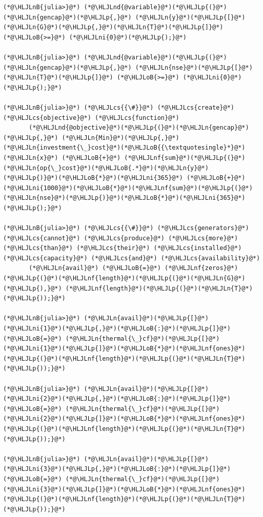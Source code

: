 \documentclass[12pt,a4paper]{article}
\newcommand{\HLJLn}[1]{#1}
\newcommand{\HLJLnd}[1]{\textcolor[RGB]{214,102,97}{#1}}
\newcommand{\HLJLnf}[1]{\textcolor[RGB]{66,102,213}{#1}}
\newcommand{\HLJLnB}[1]{\textcolor[RGB]{59,151,46}{#1}}
\newcommand{\HLJLni}[1]{\textcolor[RGB]{59,151,46}{#1}}
\newcommand{\HLJLoB}[1]{\textcolor[RGB]{102,102,102}{\textbf{#1}}}
\newcommand{\HLJLp}[1]{#1}
\newcommand{\HLJLcs}[1]{\textcolor[RGB]{153,153,119}{\textit{#1}}}
\begin{document}
\begin{lstlisting}
(*@\HLJLnB{julia>}@*) (*@\HLJLnd{@variable}@*)(*@\HLJLp{(}@*)(*@\HLJLn{gencap}@*)(*@\HLJLp{,}@*) (*@\HLJLn{y}@*)(*@\HLJLp{[}@*)(*@\HLJLn{G}@*)(*@\HLJLp{,}@*)(*@\HLJLn{T}@*)(*@\HLJLp{]}@*) (*@\HLJLoB{>=}@*) (*@\HLJLni{0}@*)(*@\HLJLp{);}@*)

(*@\HLJLnB{julia>}@*) (*@\HLJLnd{@variable}@*)(*@\HLJLp{(}@*)(*@\HLJLn{gencap}@*)(*@\HLJLp{,}@*) (*@\HLJLn{nse}@*)(*@\HLJLp{[}@*)(*@\HLJLn{T}@*)(*@\HLJLp{]}@*) (*@\HLJLoB{>=}@*) (*@\HLJLni{0}@*)(*@\HLJLp{);}@*)

(*@\HLJLnB{julia>}@*) (*@\HLJLcs{{\#}}@*) (*@\HLJLcs{create}@*) (*@\HLJLcs{objective}@*) (*@\HLJLcs{function}@*)
       (*@\HLJLnd{@objective}@*)(*@\HLJLp{(}@*)(*@\HLJLn{gencap}@*)(*@\HLJLp{,}@*) (*@\HLJLn{Min}@*)(*@\HLJLp{,}@*) (*@\HLJLn{investment{\_}cost}@*)(*@\HLJLoB{{\textquotesingle}*}@*)(*@\HLJLn{x}@*) (*@\HLJLoB{+}@*) (*@\HLJLnf{sum}@*)(*@\HLJLp{(}@*)(*@\HLJLn{op{\_}cost}@*)(*@\HLJLoB{.*}@*)(*@\HLJLn{y}@*)(*@\HLJLp{)}@*)(*@\HLJLoB{*}@*)(*@\HLJLni{365}@*) (*@\HLJLoB{+}@*) (*@\HLJLni{1000}@*)(*@\HLJLoB{*}@*)(*@\HLJLnf{sum}@*)(*@\HLJLp{(}@*)(*@\HLJLn{nse}@*)(*@\HLJLp{)}@*)(*@\HLJLoB{*}@*)(*@\HLJLni{365}@*)(*@\HLJLp{);}@*)

(*@\HLJLnB{julia>}@*) (*@\HLJLcs{{\#}}@*) (*@\HLJLcs{generators}@*) (*@\HLJLcs{cannot}@*) (*@\HLJLcs{produce}@*) (*@\HLJLcs{more}@*) (*@\HLJLcs{than}@*) (*@\HLJLcs{their}@*) (*@\HLJLcs{installed}@*) (*@\HLJLcs{capacity}@*) (*@\HLJLcs{and}@*) (*@\HLJLcs{availability}@*)
       (*@\HLJLn{avail}@*) (*@\HLJLoB{=}@*) (*@\HLJLnf{zeros}@*)(*@\HLJLp{(}@*)(*@\HLJLnf{length}@*)(*@\HLJLp{(}@*)(*@\HLJLn{G}@*)(*@\HLJLp{),}@*) (*@\HLJLnf{length}@*)(*@\HLJLp{(}@*)(*@\HLJLn{T}@*)(*@\HLJLp{));}@*)

(*@\HLJLnB{julia>}@*) (*@\HLJLn{avail}@*)(*@\HLJLp{[}@*)(*@\HLJLni{1}@*)(*@\HLJLp{,}@*)(*@\HLJLoB{:}@*)(*@\HLJLp{]}@*) (*@\HLJLoB{=}@*) (*@\HLJLn{thermal{\_}cf}@*)(*@\HLJLp{[}@*)(*@\HLJLni{1}@*)(*@\HLJLp{]}@*)(*@\HLJLoB{*}@*)(*@\HLJLnf{ones}@*)(*@\HLJLp{(}@*)(*@\HLJLnf{length}@*)(*@\HLJLp{(}@*)(*@\HLJLn{T}@*)(*@\HLJLp{));}@*)

(*@\HLJLnB{julia>}@*) (*@\HLJLn{avail}@*)(*@\HLJLp{[}@*)(*@\HLJLni{2}@*)(*@\HLJLp{,}@*)(*@\HLJLoB{:}@*)(*@\HLJLp{]}@*) (*@\HLJLoB{=}@*) (*@\HLJLn{thermal{\_}cf}@*)(*@\HLJLp{[}@*)(*@\HLJLni{2}@*)(*@\HLJLp{]}@*)(*@\HLJLoB{*}@*)(*@\HLJLnf{ones}@*)(*@\HLJLp{(}@*)(*@\HLJLnf{length}@*)(*@\HLJLp{(}@*)(*@\HLJLn{T}@*)(*@\HLJLp{));}@*)

(*@\HLJLnB{julia>}@*) (*@\HLJLn{avail}@*)(*@\HLJLp{[}@*)(*@\HLJLni{3}@*)(*@\HLJLp{,}@*)(*@\HLJLoB{:}@*)(*@\HLJLp{]}@*) (*@\HLJLoB{=}@*) (*@\HLJLn{thermal{\_}cf}@*)(*@\HLJLp{[}@*)(*@\HLJLni{3}@*)(*@\HLJLp{]}@*)(*@\HLJLoB{*}@*)(*@\HLJLnf{ones}@*)(*@\HLJLp{(}@*)(*@\HLJLnf{length}@*)(*@\HLJLp{(}@*)(*@\HLJLn{T}@*)(*@\HLJLp{));}@*)


\end{lstlisting}
\end{document}
